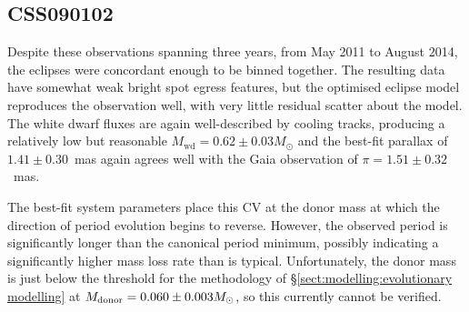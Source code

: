 \newpage
\subsection{CSS090102}

Despite these observations spanning three years, from May 2011 to August 2014, the eclipses were concordant enough to be binned together.
The resulting data have somewhat weak bright spot egress features, but the optimised eclipse model reproduces the observation well, with very little residual scatter about the model.
The white dwarf fluxes are again well-described by cooling tracks, producing a relatively low but reasonable $M_\mathrm{wd} = 0.62\pm0.03 M_\odot$ and the best-fit parallax of $1.41\pm0.30$~mas again agrees well with the Gaia observation of $\pi = 1.51\pm0.32$~mas.

The best-fit system parameters place this CV at the donor mass at which the direction of period evolution begins to reverse. However, the observed period is significantly longer than the canonical period minimum, possibly indicating a significantly higher mass loss rate than is typical. Unfortunately, the donor mass is just below the threshold for the methodology of \S\ref{sect:modelling:evolutionary modelling} at $M_{\rm donor} = 0.060\pm0.003 M_\odot$, so this currently cannot be verified.


%     

